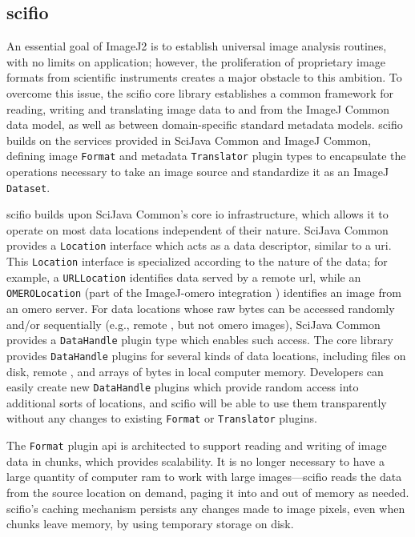 \documentclass{bmcart}
\begin{document}
\subsection*{\acrshort{scifio}} An essential goal of ImageJ2 is to establish
universal image analysis routines, with no limits on application; however, the
proliferation of proprietary image formats from scientific instruments creates
a major obstacle to this ambition. To overcome this issue, the
\acrshort{scifio} core library establishes a common framework for reading,
writing and translating image data to and from the ImageJ Common data model, as
well as between domain-specific standard metadata models. \acrshort{scifio}
builds on the services provided in SciJava Common and ImageJ Common, defining
image \texttt{Format} and metadata \texttt{Translator} plugin types to
encapsulate the operations necessary to take an image source and standardize it
as an ImageJ \texttt{Dataset}.

\acrshort{scifio} builds upon SciJava Common's core \acrshort{io}
infrastructure, which allows it to operate on most data locations independent
of their nature. SciJava Common provides a \texttt{Location} interface which
acts as a data descriptor, similar to a \acrfull{uri}. This \texttt{Location}
interface is specialized according to the nature of the data; for example, a
\texttt{URLLocation} identifies data served by a remote \acrfull{url}, while
an \texttt{OMEROLocation} (part of the ImageJ-\acrshort{omero} integration
\cite{imagej_omero}) identifies an image from an \acrshort{omero} server. For
data locations whose raw bytes can be accessed randomly and/or sequentially
(e.g., remote , but not \acrshort{omero} images), SciJava
Common provides a \texttt{DataHandle} plugin type which enables such access.
The core library provides \texttt{DataHandle} plugins for several kinds of data
locations, including files on disk, remote , and arrays of
bytes in local computer memory. Developers can easily create new
\texttt{DataHandle} plugins which provide random access into additional sorts
of locations, and \acrshort{scifio} will be able to use them transparently
without any changes to existing \texttt{Format} or \texttt{Translator} plugins.

The \texttt{Format} plugin \acrshort{api} is architected to support reading and
writing of image data in chunks, which provides scalability. It is no longer
necessary to have a large quantity of computer \acrshort{ram} to work with
large images---\acrshort{scifio} reads the data from the source location on
demand, paging it into and out of memory as needed. \acrshort{scifio}'s caching
mechanism persists any changes made to image pixels, even when chunks leave
memory, by using temporary storage on disk.
\end{document}
